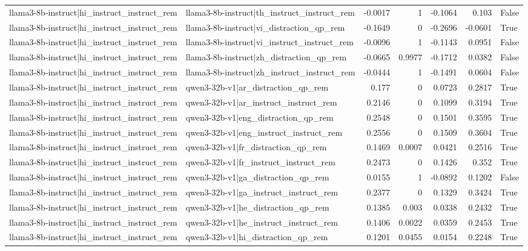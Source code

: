 \begin{table}
\begin{tabular}{l l r r r r l}
llama3-8b-instruct|hi_instruct_instruct_rem & llama3-8b-instruct|th_instruct_instruct_rem & -0.0017 & 1 & -0.1064 & 0.103 & False \\
llama3-8b-instruct|hi_instruct_instruct_rem & llama3-8b-instruct|vi_distraction_qp_rem & -0.1649 & 0 & -0.2696 & -0.0601 & True \\
llama3-8b-instruct|hi_instruct_instruct_rem & llama3-8b-instruct|vi_instruct_instruct_rem & -0.0096 & 1 & -0.1143 & 0.0951 & False \\
llama3-8b-instruct|hi_instruct_instruct_rem & llama3-8b-instruct|zh_distraction_qp_rem & -0.0665 & 0.9977 & -0.1712 & 0.0382 & False \\
llama3-8b-instruct|hi_instruct_instruct_rem & llama3-8b-instruct|zh_instruct_instruct_rem & -0.0444 & 1 & -0.1491 & 0.0604 & False \\
llama3-8b-instruct|hi_instruct_instruct_rem & qwen3-32b-v1|ar_distraction_qp_rem & 0.177 & 0 & 0.0723 & 0.2817 & True \\
llama3-8b-instruct|hi_instruct_instruct_rem & qwen3-32b-v1|ar_instruct_instruct_rem & 0.2146 & 0 & 0.1099 & 0.3194 & True \\
llama3-8b-instruct|hi_instruct_instruct_rem & qwen3-32b-v1|eng_distraction_qp_rem & 0.2548 & 0 & 0.1501 & 0.3595 & True \\
llama3-8b-instruct|hi_instruct_instruct_rem & qwen3-32b-v1|eng_instruct_instruct_rem & 0.2556 & 0 & 0.1509 & 0.3604 & True \\
llama3-8b-instruct|hi_instruct_instruct_rem & qwen3-32b-v1|fr_distraction_qp_rem & 0.1469 & 0.0007 & 0.0421 & 0.2516 & True \\
llama3-8b-instruct|hi_instruct_instruct_rem & qwen3-32b-v1|fr_instruct_instruct_rem & 0.2473 & 0 & 0.1426 & 0.352 & True \\
llama3-8b-instruct|hi_instruct_instruct_rem & qwen3-32b-v1|ga_distraction_qp_rem & 0.0155 & 1 & -0.0892 & 0.1202 & False \\
llama3-8b-instruct|hi_instruct_instruct_rem & qwen3-32b-v1|ga_instruct_instruct_rem & 0.2377 & 0 & 0.1329 & 0.3424 & True \\
llama3-8b-instruct|hi_instruct_instruct_rem & qwen3-32b-v1|he_distraction_qp_rem & 0.1385 & 0.003 & 0.0338 & 0.2432 & True \\
llama3-8b-instruct|hi_instruct_instruct_rem & qwen3-32b-v1|he_instruct_instruct_rem & 0.1406 & 0.0022 & 0.0359 & 0.2453 & True \\
llama3-8b-instruct|hi_instruct_instruct_rem & qwen3-32b-v1|hi_distraction_qp_rem & 0.1201 & 0.0455 & 0.0154 & 0.2248 & True \\

\end{tabular}
\end{table}
